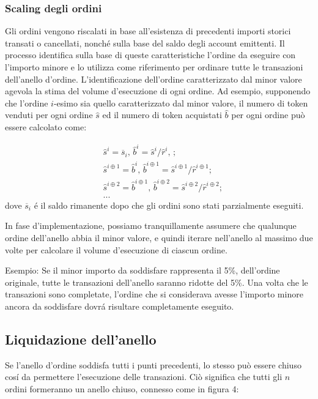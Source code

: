 \documentclass[UTF8,nofonts]{article}
\begin{document}
\begin{multicols}{2}
\subsubsection{Scaling degli ordini\label{sec:order_scaling}}
Gli ordini vengono riscalati in base all'esistenza di precedenti importi storici transati o cancellati, nonch\'e sulla base del saldo degli account emittenti. Il processo identifica sulla base di queste caratteristiche l'ordine da eseguire con l'importo minore e lo utilizza come riferimento per ordinare tutte le transazioni dell'anello d'ordine.
L'identificazione dell'ordine caratterizzato dal minor valore agevola la stima del volume d'esecuzione di ogni ordine. Ad esempio, supponendo che l'ordine $i$-esimo sia quello caratterizzato dal minor valore, il numero di token venduti per ogni ordine $\hat{s}$ ed il numero di token acquistati $\hat{b}$ per ogni ordine può essere calcolato come:

\[
\begin{split}
&\hat{s}^{i}=\overline{s}_i\text{, } \hat{b}^{i}=\hat{s}^{i}/ \hat{r}^i\text{, }\text{;}\\
&\hat{s}^{i\oplus 1}=\hat{b}^i\text{, } \hat{b}^{i\oplus 1}=\hat{s}^{i\oplus 1}/ \hat{r}^{i\oplus 1}\text{;}\\
&\hat{s}^{i\oplus 2}=\hat{b}^{i\oplus 1}\text{, } \hat{b}^{i\oplus 2}=\hat{s}^{i\oplus 2}/ \hat{r}^{i\oplus 2}\text{;}\\
& ...
\end{split}
\]
dove $\overline{s}_i$ \'e il saldo rimanente dopo che gli ordini sono stati parzialmente eseguiti.

In fase d'implementazione, possiamo tranquillamente assumere che qualunque ordine dell'anello abbia il minor valore, e quindi iterare nell'anello al massimo due volte per calcolare il volume d'esecuzione di ciascun ordine.

Esempio: Se il minor importo da soddisfare rappresenta il 5\%, dell'ordine originale, tutte le transazioni dell'anello saranno ridotte del 5\%. Una volta che le transazioni sono completate, l'ordine che si considerava avesse l'importo minore ancora da soddisfare dovr\'a  risultare completamente eseguito.

\subsection{Liquidazione dell'anello\label{sec:settlement}}

Se l'anello d'ordine soddisfa tutti i punti precedenti, lo stesso può essere chiuso cos\'i da permettere l'esecuzione delle transazioni. Ciò significa che tutti gli $n$ ordini formeranno un anello chiuso, connesso come in figura 4:


\end{multicols}
\end{document}
